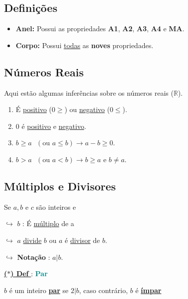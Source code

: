 \subsection*{Definições}

\begin{itemize}[left=0pt, label={\(\bullet\)}]
    \item \textbf{Anel:} Possui as propriedades \textbf{A1}, \textbf{A2}, \textbf{A3}, \textbf{A4} e \textbf{MA}.
    \item \textbf{Corpo:} Possui \underline{todas} as \textbf{noves} propriedades.
\end{itemize}

\subsection*{Números Reais}

Aqui estão algumas inferências sobre os números reais ($\mathbb{R}$).

\begin{enumerate}
    \item É \underline{positivo} ($0 \geq $) ou \underline{negativo} ($0 \leq$).
    \item $0$ é \underline{positivo} e \underline{negativo}.
    \item $b \geq a \text{ }(\text{ou } a \leq b) \rightarrow a-b \geq 0$.
    \item $b > a \text{ }(\text{ou }  a < b) \rightarrow b \geq a \text{ e } b \ne a$.
\end{enumerate}

\subsection*{Múltiplos e Divisores}
Se $a,b$ e $c$ são inteiros e  

$\hookrightarrow$ $b$ : É \underline{múltiplo} de a 

$\hookrightarrow$ $a$ \underline{divide} $b$ ou $a$ é \underline{divisor} de $b$.

$\hookrightarrow$ \textbf{Notação} : $a|b$.

\vspace{0.4cm}

\noindent\underline{\underline{\textbf{($\ast$) Def }}} : \textbf{\textcolor{teal}{Par}} 

\vspace{0.1cm}

\noindent $b$ é um inteiro \underline{\textbf{par}} se \underline{$2|b$}, caso contrário, $b$ é \underline{\textbf{ímpar}}

